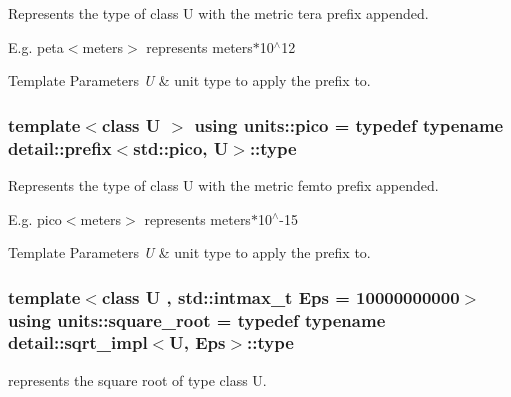 Represents the type of {\ttfamily class U} with the metric \textquotesingle{}tera\textquotesingle{} prefix appended. 

E.\+g. peta$<$meters$>$ represents meters$\ast$10$^\wedge$12 
\begin{DoxyTemplParams}{Template Parameters}
{\em U} & unit type to apply the prefix to. \\
\hline
\end{DoxyTemplParams}
\hypertarget{group___unit_manipulators_ga82a8d14a3e0877a375a66b64c45baab9}{}
\subsubsection[{pico}]{\setlength{\rightskip}{0pt plus 5cm}template$<$class U $>$ using {\bf units\+::pico} = typedef typename detail\+::prefix$<$std\+::pico, U$>$\+::type}\label{group___unit_manipulators_ga82a8d14a3e0877a375a66b64c45baab9}


Represents the type of {\ttfamily class U} with the metric \textquotesingle{}femto\textquotesingle{} prefix appended. 

E.\+g. pico$<$meters$>$ represents meters$\ast$10$^\wedge$-\/15 
\begin{DoxyTemplParams}{Template Parameters}
{\em U} & unit type to apply the prefix to. \\
\hline
\end{DoxyTemplParams}
\hypertarget{group___unit_manipulators_ga66c5d3d0e80c7c3e56683d7df366b380}{}
\subsubsection[{square\+\_\+root}]{\setlength{\rightskip}{0pt plus 5cm}template$<$class U , std\+::intmax\+\_\+t Eps = 10000000000$>$ using {\bf units\+::square\+\_\+root} = typedef typename detail\+::sqrt\+\_\+impl$<$U, Eps$>$\+::type}\label{group___unit_manipulators_ga66c5d3d0e80c7c3e56683d7df366b380}


represents the square root of type {\ttfamily class U}. 

